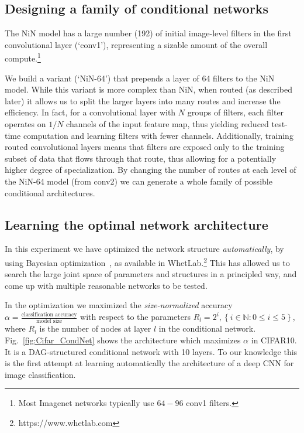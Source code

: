 \documentclass[thesis]{subfiles}
\begin{document}
	\subsection{Designing a family of conditional networks}
	The NiN model has a large number (192) of initial image-level filters in the first convolutional layer (`conv1'), 
	representing a sizable amount of the overall compute.\footnote{Most Imagenet networks typically use $64-96$ conv1 filters.}
	
	We build a variant (`NiN-64') that prepends a layer of 64 filters to the NiN model.
	While this variant is more complex than NiN, when routed (as described later) it allows us 
	to split the larger layers into many routes and increase the efficiency.
	In fact, for a convolutional layer with $N$ groups of filters, each filter operates on $1/N$ channels of the input feature map, thus yielding reduced test-time computation and learning filters with fewer channels. 
	Additionally, training routed convolutional layers means that filters are exposed only to the training subset of data that flows through that route, thus allowing for a potentially higher degree of specialization.
	By changing the number of routes at each level of the NiN-64 model (from conv2) we can 
	generate a whole family of possible conditional architectures. 
	
	\subsection{Learning the optimal network architecture}
	In this experiment we have optimized the network structure {\em automatically}, 
	by using Bayesian optimization~\citep{Snoek2012}, as available in WhetLab.\footnote{https://www.whetlab.com} 
	This has allowed us to search the large joint space of parameters and structures in a principled way, 
	and come up with multiple reasonable networks to be tested. 
	
	In the optimization we maximized the {\em size-normalized} accuracy $\alpha =\frac{\textrm{classification accuracy}}{\textrm{model size}}$ with respect to the parameters $R_l = 2^i, \left\{i\in \mathbb{N} : 0 \le i \le 5\right\}$, where $R_l$ is the number of nodes at layer $l$ in the conditional network. 
	Fig.~\ref{fig:Cifar_CondNet} shows the architecture which maximizes $\alpha$ in CIFAR10. 
	It is a DAG-structured conditional network with 10 layers.
	To our knowledge this is the first attempt at learning automatically the architecture of a deep CNN for image classification.
	
\end{document}
